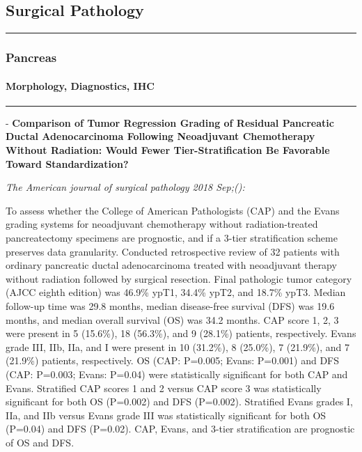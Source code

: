\documentclass[]{article}
\let\oldparagraph\paragraph
\renewcommand{\paragraph}[1]{\oldparagraph{#1}\mbox{}}
\begin{document}
\pagebreak

\hypertarget{surgical-pathology}{%
\subsection{Surgical Pathology}\label{surgical-pathology}}

\begin{center}\rule{0.5\linewidth}{\linethickness}\end{center}

\hypertarget{pancreas}{%
\subsubsection{Pancreas}\label{pancreas}}

\hypertarget{morphology-diagnostics-ihc}{%
\paragraph{Morphology, Diagnostics,
IHC}\label{morphology-diagnostics-ihc}}

\begin{center}\rule{0.5\linewidth}{\linethickness}\end{center}

 - \textbf{Comparison of Tumor Regression Grading of Residual Pancreatic
Ductal Adenocarcinoma Following Neoadjuvant Chemotherapy Without
Radiation: Would Fewer Tier-Stratification Be Favorable Toward
Standardization?}

\emph{The American journal of surgical pathology 2018 Sep;():}

To assess whether the College of American Pathologists (CAP) and the
Evans grading systems for neoadjuvant chemotherapy without
radiation-treated pancreatectomy specimens are prognostic, and if a
3-tier stratification scheme preserves data granularity. Conducted
retrospective review of 32 patients with ordinary pancreatic ductal
adenocarcinoma treated with neoadjuvant therapy without radiation
followed by surgical resection. Final pathologic tumor category (AJCC
eighth edition) was 46.9\% ypT1, 34.4\% ypT2, and 18.7\% ypT3. Median
follow-up time was 29.8 months, median disease-free survival (DFS) was
19.6 months, and median overall survival (OS) was 34.2 months. CAP score
1, 2, 3 were present in 5 (15.6\%), 18 (56.3\%), and 9 (28.1\%)
patients, respectively. Evans grade III, IIb, IIa, and I were present in
10 (31.2\%), 8 (25.0\%), 7 (21.9\%), and 7 (21.9\%) patients,
respectively. OS (CAP: P=0.005; Evans: P=0.001) and DFS (CAP: P=0.003;
Evans: P=0.04) were statistically significant for both CAP and Evans.
Stratified CAP scores 1 and 2 versus CAP score 3 was statistically
significant for both OS (P=0.002) and DFS (P=0.002). Stratified Evans
grades I, IIa, and IIb versus Evans grade III was statistically
significant for both OS (P=0.04) and DFS (P=0.02). CAP, Evans, and
3-tier stratification are prognostic of OS and DFS.
\end{document}
